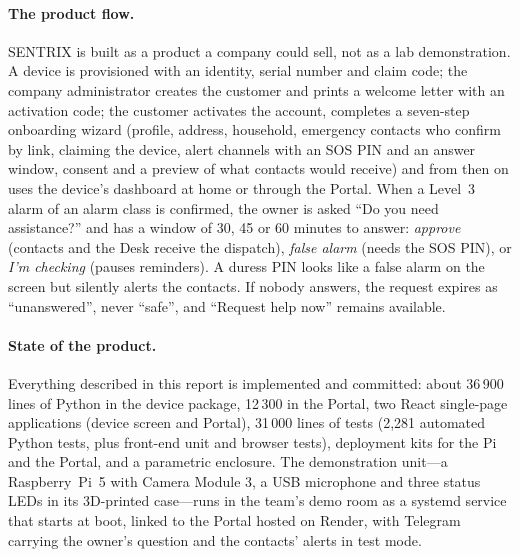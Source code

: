 \paragraph{The product flow.} SENTRIX is built as a product a company could sell, not as a lab demonstration. A device is provisioned with an identity, serial number and claim code; the company administrator creates the customer and prints a welcome letter with an activation code; the customer activates the account, completes a seven-step onboarding wizard (profile, address, household, emergency contacts who confirm by link, claiming the device, alert channels with an SOS PIN and an answer window, consent and a preview of what contacts would receive) and from then on uses the device's dashboard at home or through the Portal. When a Level~3 alarm of an alarm class is confirmed, the owner is asked ``Do you need assistance?'' and has a window of 30, 45 or 60 minutes to answer: \emph{approve} (contacts and the Desk receive the dispatch), \emph{false alarm} (needs the SOS PIN), or \emph{I'm checking} (pauses reminders). A duress PIN looks like a false alarm on the screen but silently alerts the contacts. If nobody answers, the request expires as ``unanswered'', never ``safe'', and ``Request help now'' remains available.

\paragraph{State of the product.} Everything described in this report is implemented and committed: about 36\,900 lines of Python in the device package, 12\,300 in the Portal, two React single-page applications (device screen and Portal), 31\,000 lines of tests (2,281 automated Python tests, plus front-end unit and browser tests), deployment kits for the Pi and the Portal, and a parametric enclosure. The demonstration unit---a Raspberry~Pi~5 with Camera Module 3, a USB microphone and three status LEDs in its 3D-printed case---runs in the team's demo room as a systemd service that starts at boot, linked to the Portal hosted on Render, with Telegram carrying the owner's question and the contacts' alerts in test mode.

